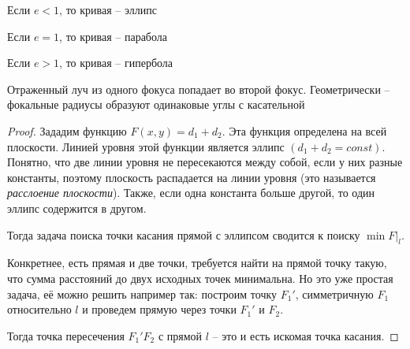 \begin{Rem}
	\begin{MyItemize}
		\item Если $e < 1$, то кривая -- эллипс
		\item Если $e = 1$, то кривая -- парабола
		\item Если $e > 1$, то кривая -- гипербола
	\end{MyItemize}

	\begin{figure}[H]
		\centering
		\def\svgwidth{.35\columnwidth}
		
	\end{figure}
\end{Rem}

\begin{Property}
	Отраженный луч из одного фокуса попадает во второй фокус. Геометрически -- фокальные радиусы образуют одинаковые углы с касательной
\end{Property}

\begin{proof}
    Зададим функцию $F(x, y) = d_1 + d_2$. Эта функция определена на всей плоскости. Линией уровня этой функции является эллипс $(d_1 + d_2 = const)$.
    Понятно, что две линии уровня не пересекаются между собой, если у них разные константы, поэтому плоскость распадается на линии уровня (это называется \textit{расслоение плоскости}).
    Также, если одна константа больше другой, то один эллипс содержится в другом. 

	\begin{figure}[H]
		\centering
		\def\svgwidth{.35\columnwidth}
			
	\end{figure}

    Тогда задача поиска точки касания прямой с эллипсом сводится к поиску $\min F|_l$. 

    Конкретнее, есть прямая и две точки, требуется найти на прямой точку такую, что сумма расстояний до двух исходных точек минимальна.
	Но это уже простая задача, её можно решить например так: построим точку $F_1'$, симметричную $F_1$ относительно $l$ и проведем прямую через точки $F_1'$ и $F_2$. 

	\begin{figure}[H]
		\centering
		\def\svgwidth{.35\columnwidth}
			
	\end{figure}

	Тогда точка пересечения $F_1' F_2$ с прямой $l$ -- это и есть искомая точка касания. 
\end{proof}

